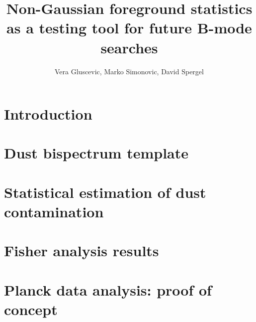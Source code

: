 \documentclass[a4paper, traditabstract,longauth]{aa}
\begin{document}
%
\title{Non-Gaussian foreground statistics as a testing tool for future B-mode searches}

\author{Vera Gluscevic, Marko Simonovic, David Spergel}



%


\maketitle

\section {Introduction}
\label{intro}



\section{Dust bispectrum template}
\label{sec:template}



\section{Statistical estimation of dust contamination}
\label{sec:contamination}



\section{Fisher analysis results}
\label{sec:results}



\section{Planck data analysis: proof of concept}
\label{sec:proof}


\end{document}
